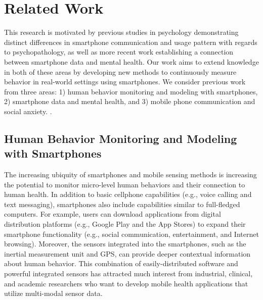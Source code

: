 


\section{Related Work}

\label{sec:related-work}

This research is motivated by previous studies in psychology demonstrating distinct differences in smartphone communication and usage pattern with regards to psychopathology, as well as more recent work establishing a connection between smartphone data and mental health. Our work aims to extend knowledge in both of these areas by developing new methods to continuously measure behavior in real-world settings using smartphones.  We consider previous work from three areas: 1) human behavior monitoring and modeling with smartphones, 2) smartphone data and mental health, and 3) mobile phone communication and social anxiety.
.

\subsection{Human Behavior Monitoring and Modeling with Smartphones}
The increasing ubiquity of smartphones and mobile sensing methods is increasing the potential to monitor micro-level human behaviors and their connection to human health. 
In addition to basic cellphone capabilities (e.g., voice calling and text messaging), smartphones also include capabilities similar to full-fledged computers. For example, users can download applications from digital distribution platforms (e.g., Google Play and the App Stores) to expand their smartphone functionality (e.g., social communication, entertainment, and Internet browsing). Moreover, the sensors integrated into the smartphones, such as the inertial measurement unit and GPS, can provide deeper contextual information about human behavior. This combination of easily-distributed software and powerful integrated sensors has attracted much interest from industrial, clinical, and academic researchers who want to develop mobile health applications that utilize multi-modal sensor data. 


